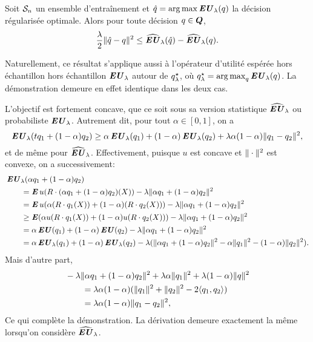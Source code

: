 \begin{lemme}
  \label{lem:conv}
  Soit $\S_n$ un ensemble d'entraînement et $\qh = \argmax\EU_\lambda(q)$ la décision
  régularisée optimale. Alors pour toute décision $q \in \Q$,
  \begin{equation}
    \frac{\lambda}{2}\|\qh - q\|^2 \leq \hEU_\lambda(\qh) - \hEU_\lambda(q).
  \end{equation}
\end{lemme}

\begin{rem}
  Naturellement, ce résultat s'applique aussi à l'opérateur d'utilité espérée hors
  échantillon hors échantillon $\EU_\lambda$ autour de $\qsl$, où
  $\qsl = \argmax_q\EU_\lambda(q)$. La démonstration demeure en effet identique dans les deux
  cas.
\end{rem}



\begin{lemme}
  \label{lem:conv2}
  L'objectif est fortement concave, que ce soit sous sa version statistique $\hEU_\lambda$ ou
  probabiliste $\EU_\lambda$. Autrement dit, pour tout $\alpha \in [0,1]$, on a
  \begin{equation}
    \EU_\lambda(tq_1 + (1-\alpha )q_2) \geq \alpha \EU_\lambda(q_1) + (1-\alpha)\EU_\lambda(q_2) + \lambda \alpha(1-\alpha)\nq{q_1-q_2}^2,
  \end{equation}
  et de même pour $\hEU_\lambda$. Effectivement, puisque $u$ est concave et $\nq{\cdot}^2$ est
  convexe, on a successivement:
  \begin{align}
    & \EU_\lambda(\alpha q_1 + (1-\alpha )q_2)\\
    &\qquad= \E u(R\cdot (\alpha q_1+(1-\alpha )q_2)(X)) - \lambda\nq{\alpha q_1 + (1-\alpha)q_2}^2\\
    &\qquad= \E u(\alpha (R\cdot q_1(X)) + (1-\alpha )(R\cdot q_2(X)))- \lambda\nq{\alpha q_1 + (1-\alpha)q_2}^2\\
    &\qquad\geq \E(\alpha  u(R\cdot q_1(X)) + (1-\alpha )u(R\cdot q_2(X))) - \lambda\nq{\alpha q_1 + (1-\alpha)q_2}^2\\
    &\qquad= \alpha\EU(q_1) + (1-\alpha)\EU(q_2) - \lambda\nq{\alpha q_1 + (1-\alpha)q_2}^2\\
    &\qquad= \alpha\EU_\lambda(q_1) + (1-\alpha)\EU_\lambda(q_2) - \lambda(\nq{\alpha q_1+(1-\alpha)q_2}^2 - \alpha\nq{q_1}^2 -
      (1-\alpha)\nq{q_2}^2).
  \end{align}
  Mais d'autre part,
  \begin{align}
    &-\lambda\nq{\alpha q_1 + (1-\alpha)q_2}^2 + \lambda\alpha\nq{q_1}^2+\lambda(1-\alpha)\nq{q}^2\\
    &\qquad = \lambda\alpha(1-\alpha)(\nq{q_1}^2 + \nq{q_2}^2 - 2\langle q_1,q_2\rangle)\\
    &\qquad = \lambda\alpha(1-\alpha)\nq{q_1-q_2}^2,
  \end{align}
  Ce qui complète la démonstration. La dérivation demeure exactement la même lorsqu'on
  considère $\hEU_\lambda$.
\end{lemme}

